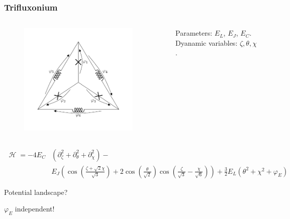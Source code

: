 \documentclass[10pt]{beamer}
\DeclareMathOperator{\ham}{\mathcal{H}}
\begin{document}




\begin{frame}[shrink=20]

\frametitle{Trifluxonium}

\vspace{0.5cm} 

\begin{columns}
\begin{figure}
	\centering
	\includegraphics[trim={0cm 1cm 0cm 1cm}, clip, width=0.9\textwidth]{triflux_branch.pdf}
\end{figure}
Parameters: $E_L$, $E_J$, $E_C$.
Dyanamic variables: $\zeta, \theta, \chi$.
\end{columns}

\vspace{0.5cm}

\begin{align*}
\ham = -4 E_C & \left( \partial_\zeta^2 + \partial_\theta^2 + \partial_\chi^2 \right) - \\
& E_J \left( \cos{\left(\frac{\zeta + \sqrt{2} \chi}{\sqrt{3}}\right)} + 2 \cos{\left(\frac{\theta}{\sqrt{2}}\right)} \cos{\left(\frac{\zeta}{\sqrt{3}} - \frac{\chi}{\sqrt{6}}\right)} \right) + \frac{3}{2} E_L (\theta^2 + \chi^2 + \varphi_E)
\end{align*}

Potential landscape?

$\varphi_E$ independent!


\end{frame}
\end{document}

